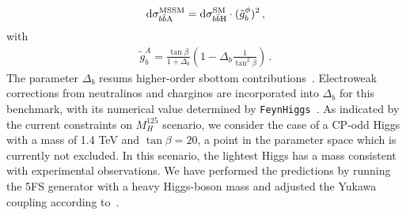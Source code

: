 \documentclass[11pt,a4paper]{article}
\newcommand{\dd}{\mathop{}\!\mathrm{d}}
\begin{document}
\begin{align}
	\dd \sigma_{b\bar b \text{A}}^{\text{MSSM}} = \dd \sigma_{\bbH{}}^{\text{SM}} \cdot (\tilde g_b^{\phi})^2\,,	\label{eq:BSMYuk}
\end{align}
with
\begin{align}
	\tilde{g}_b^A = \frac{\tan \beta}{1 + \Delta_b} \left( 1 - \Delta_b \frac{1}{\tan^2\beta} \right)\,.
\end{align}
The parameter \( \Delta_b \) resums higher-order sbottom contributions~\cite{Banks:1987iu,Hall:1993gn,Carena:1994bv,Carena:2000uj}. Electroweak corrections from neutralinos and charginos are incorporated into \( \Delta_b \) for this benchmark, with its numerical value determined by \texttt{FeynHiggs}~\cite{Heinemeyer:1998yj,Bahl:2018qog}. 
As indicated by the current constraints on \( M_H^{125} \) scenario, we consider the case of a CP-odd Higgs with a mass of 1.4 TeV and \( \tan\beta = 20 \), a point in the parameter space which is currently not excluded. In this scenario, the lightest Higgs has a mass consistent with experimental observations. We have performed the predictions by running the \minnlo{} 5FS generator with a heavy Higgs-boson mass and adjusted the Yukawa coupling according to~.
\end{document}
